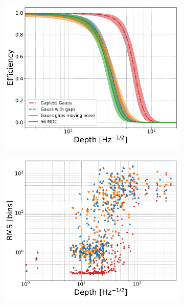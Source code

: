 \begin{figure}[p]
\begin{subfigure}[h]{0.49\columnwidth}
\includegraphics[scale=0.3]{C3_soap/s6_efficiency_depth.pdf}
\subcaption{}
\label{soap:results:gausss6:eff_depth}
\end{subfigure}
\begin{subfigure}[h]{0.49\columnwidth}
\includegraphics[scale=0.3]{C3_soap/gauss_s6_frac_depth.pdf}
\subcaption{}
\label{soap:results:gausss6:res_depth}
\end{subfigure}


\end{figure}
